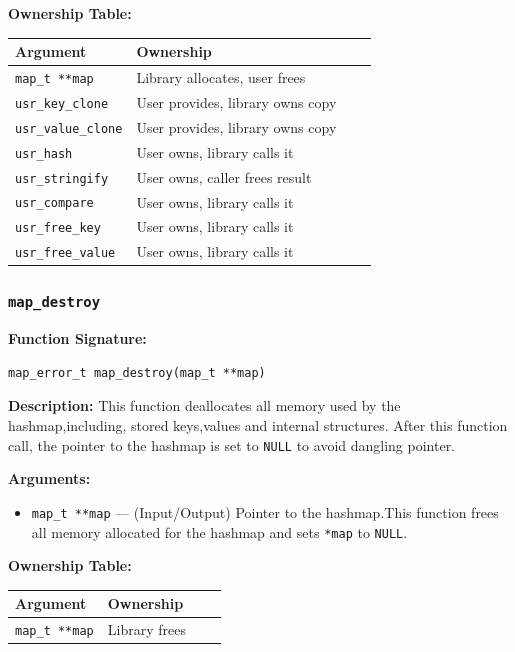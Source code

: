 \documentclass[titlepage]{article}
\begin{document}
\textbf{Ownership Table:}
\begin{center}
\begin{tabular}{@{} l l c c @{} }
\toprule
\textbf{Argument} & \textbf{Ownership} \\
\midrule
\texttt{map\_t **map} & Library allocates, user frees \\
\texttt{usr\_key\_clone} & User provides, library owns copy & \\
\texttt{usr\_value\_clone} & User provides, library owns copy  \\
\texttt{usr\_hash} & User owns, library calls it   \\
\texttt{usr\_stringify} & User owns, caller frees result  \\
\texttt{usr\_compare} & User owns, library calls it &  \\
\texttt{usr\_free\_key} & User owns, library calls it &  \\
\texttt{usr\_free\_value} & User owns, library calls it  \\
\bottomrule
\end{tabular}
\end{center}

\subsubsection{\texttt{map\_destroy}}
\textbf{Function Signature:}
\begin{verbatim}
map_error_t map_destroy(map_t **map)
\end{verbatim}

\textbf{Description:} This function deallocates all memory used by the hashmap,including, stored keys,values and internal structures.
After this function call, the pointer to the hashmap is set to \texttt{NULL} to avoid dangling pointer.

\textbf{Arguments:}
\begin{itemize}
\item\texttt{map\_t **map} --- (Input/Output) Pointer to the hashmap.This function frees all memory allocated for the hashmap and sets
\texttt{*map} to \texttt{NULL}.
\end{itemize}

\textbf{Ownership Table:}
\begin{center}
\begin{tabular}{@{} l l c c @{} }
\toprule
\textbf{Argument} & \textbf{Ownership} \\
\midrule
\texttt{map\_t **map} & Library frees  \\
\bottomrule
\end{tabular}
\end{center}
\end{document}
